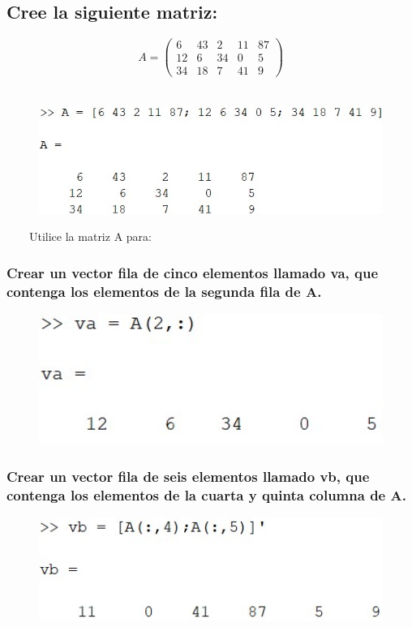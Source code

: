\documentclass{article}
\begin{document}
\subsection{Cree la siguiente matriz:}

\begin{equation*}
A =
\begin{pmatrix}
6 & 43 & 2 & 11 & 87 \\
12 & 6 & 34 & 0 & 5 \\
34 & 18 & 7 & 41 & 9
\end{pmatrix}
\end{equation*}
\
\
\
\
\begin{figure}[H]
    \centering
    \includegraphics[width = 15cm]{img6.jpg}
\end{figure}
\
\
\
\
Utilice la matriz A para:
\
\
\
\
\subsubsection{Crear un vector fila de cinco elementos llamado va, que contenga los elementos de la segunda fila de A.}
\begin{figure}[H]
    \centering
    \includegraphics[width = 12cm]{img6a.jpg}
\end{figure}
\subsubsection{Crear un vector fila de seis elementos llamado vb, que contenga los elementos de la cuarta y quinta columna de A.}
\begin{figure}[H]
    \centering
    \includegraphics[width = 12cm]{img6b.jpg}
\end{figure}
\end{document}
